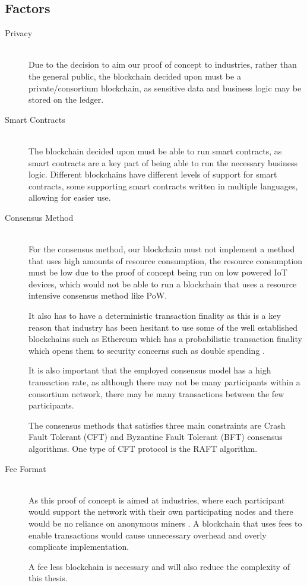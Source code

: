 \subsection{Factors}
\begin{description}

    \item[Privacy]  \hfill \\ 
        Due to the decision to aim our proof of concept to industries, rather than the general public, the blockchain decided upon must be a private/consortium blockchain, as sensitive data and business logic may be stored on the ledger.
        
    \item[Smart Contracts] \hfill \\ 
        The blockchain decided upon must be able to run smart contracts, as smart contracts are a key part of being able to run the necessary business logic. Different blockchains have different levels of support for smart contracts, some supporting smart contracts written in multiple languages, allowing for easier use. 

    \item[Consensus Method] \hfill \\ 
        
        For the consensus method, our blockchain must not implement a method that uses high amounts of resource consumption, the resource consumption must be low due to the proof of concept being run on low powered IoT devices, which would not be able to run a blockchain that uses a resource intensive consensus method like PoW.
      
        It also has to have a deterministic transaction finality as this is a key reason that industry has been hesitant to use some of the well established blockchains such as Ethereum which has a probabilistic transaction finality which opens them to security concerns such as double spending \cite{BCforIoT}.
      
        It is also important that the employed consensus model has a high transaction rate, as although there may not be many participants within a consortium network, there may be many transactions between the few participants.
        
        The consensus methods that satisfies three main constraints are Crash Fault Tolerant (CFT) and Byzantine Fault Tolerant (BFT) consensus algorithms. One type of CFT protocol is the RAFT algorithm.
        
    
    \item[Fee Format]  \hfill \\ 
        As this proof of concept is aimed at industries, where each participant would support the network with their own participating nodes and there would be no reliance on anonymous miners \cite{SCIOT}. A blockchain that uses fees to enable transactions would cause unnecessary overhead and overly complicate implementation. 
        
        A fee less blockchain is necessary and will also reduce the complexity of this thesis.
        
\end{description}

